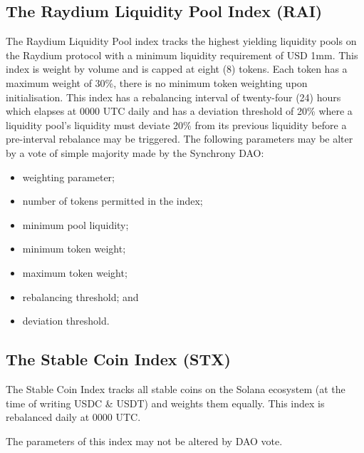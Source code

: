 \documentclass[10pt]{article}
\begin{document}
					\subsection{The Raydium Liquidity Pool Index (RAI)}
					The Raydium Liquidity Pool index tracks the highest yielding liquidity pools on
					the Raydium protocol with a minimum liquidity requirement of USD 1mm. This index
					is weight by volume and is capped at eight (8) tokens. Each token has a maximum
					weight of 30\%, there is no minimum token weighting upon initialisation. This
					index has a rebalancing interval of twenty-four (24) hours which elapses at 0000
					UTC daily and has a deviation threshold of 20\% where a liquidity pool's
					liquidity must deviate 20\% from its previous liquidity before  a pre-interval
					rebalance may be triggered. The following parameters may be alter by a vote of
					simple majority made by the Synchrony DAO:
					\begin{itemize}
						\item weighting parameter;
						\item number of tokens permitted in the index;
						\item minimum pool liquidity;
						\item minimum token weight;
						\item maximum token weight;
						\item rebalancing threshold; and
						\item deviation threshold.
					\end{itemize}

					\subsection{The Stable Coin Index (STX)}
					The Stable Coin Index tracks all stable coins on the Solana ecosystem (at the
					time of writing USDC \& USDT) and weights them equally. This index is rebalanced
					daily at 0000 UTC.

					The parameters of this index may not be altered by DAO vote.
\end{document}
